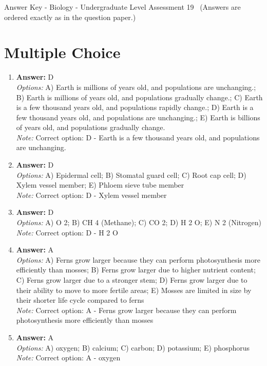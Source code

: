 \documentclass[12pt]{article}
\begin{document}
\begin{center}
Answer Key - Biology - Undergraduate Level Assessment 19 \
\small (Answers are ordered exactly as in the question paper.)
\end{center}

\section*{Multiple Choice}
\begin{enumerate}[label=\arabic*.]
\item \textbf{Answer:} D
\\ \textit{Options:} A) Earth is millions of years old, and populations are unchanging.; B) Earth is millions of years old, and populations gradually change.; C) Earth is a few thousand years old, and populations rapidly change.; D) Earth is a few thousand years old, and populations are unchanging.; E) Earth is billions of years old, and populations gradually change.
\\ \textit{Note:} Correct option: D - Earth is a few thousand years old, and populations are unchanging.
\item \textbf{Answer:} D
\\ \textit{Options:} A) Epidermal cell; B) Stomatal guard cell; C) Root cap cell; D) Xylem vessel member; E) Phloem sieve tube member
\\ \textit{Note:} Correct option: D - Xylem vessel member
\item \textbf{Answer:} D
\\ \textit{Options:} A) O 2; B) CH 4 (Methane); C) CO 2; D) H 2 O; E) N 2 (Nitrogen)
\\ \textit{Note:} Correct option: D - H 2 O
\item \textbf{Answer:} A
\\ \textit{Options:} A) Ferns grow larger because they can perform photosynthesis more efficiently than mosses; B) Ferns grow larger due to higher nutrient content; C) Ferns grow larger due to a stronger stem; D) Ferns grow larger due to their ability to move to more fertile areas; E) Mosses are limited in size by their shorter life cycle compared to ferns
\\ \textit{Note:} Correct option: A - Ferns grow larger because they can perform photosynthesis more efficiently than mosses
\item \textbf{Answer:} A
\\ \textit{Options:} A) oxygen; B) calcium; C) carbon; D) potassium; E) phosphorus
\\ \textit{Note:} Correct option: A - oxygen
\end{enumerate}
\end{document}
